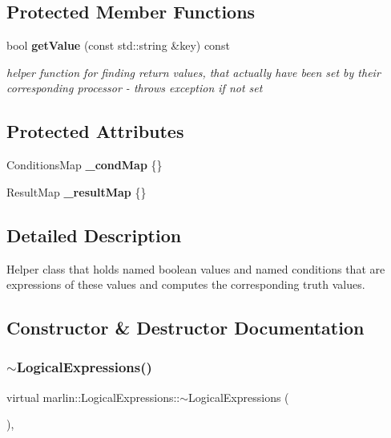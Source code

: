 \subsection*{Protected Member Functions}
\begin{DoxyCompactItemize}
\item 
\mbox{\label{classmarlin_1_1LogicalExpressions_ae864f524cb6c8287edf64b78200deab7}} 
bool \textbf{ get\+Value} (const std\+::string \&key) const
\begin{DoxyCompactList}\small\item\em helper function for finding return values, that actually have been set by their corresponding processor -\/ throws exception if not set \end{DoxyCompactList}\end{DoxyCompactItemize}
\subsection*{Protected Attributes}
\begin{DoxyCompactItemize}
\item 
\mbox{\label{classmarlin_1_1LogicalExpressions_aa9f5d0e32fc3c9d5545b27a67fe6e92e}} 
Conditions\+Map {\bfseries \+\_\+cond\+Map} \{\}
\item 
\mbox{\label{classmarlin_1_1LogicalExpressions_abce3723595c36888a1573dd7d72574d9}} 
Result\+Map {\bfseries \+\_\+result\+Map} \{\}
\end{DoxyCompactItemize}


\subsection{Detailed Description}
Helper class that holds named boolean values and named conditions that are expressions of these values and computes the corresponding truth values. 

\subsection{Constructor \& Destructor Documentation}
\mbox{\label{classmarlin_1_1LogicalExpressions_abf8b70a38de7735ba2d0c7bf5bb44fd5}} 
\subsubsection{$\sim$\+Logical\+Expressions()}
{\footnotesize\ttfamily virtual marlin\+::\+Logical\+Expressions\+::$\sim$\+Logical\+Expressions (\begin{DoxyParamCaption}{ }\end{DoxyParamCaption})\hspace{0.3cm}{\ttfamily [inline]}, {\ttfamily [virtual]}}



